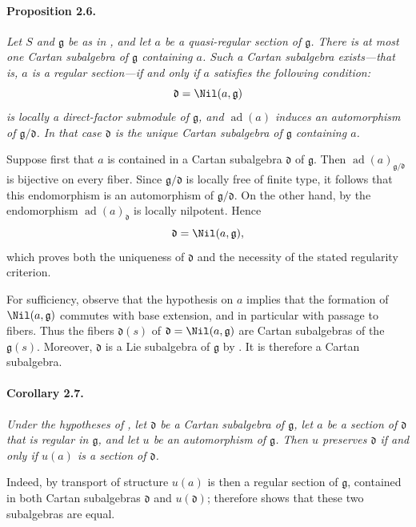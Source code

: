
\paragraph{\textbf{Proposition 2.6.}}
\emph{Let \(S\) and \(\mathfrak g\) be as in , and let \(a\) be a
quasi-regular section of \(\mathfrak g\). There is at most one Cartan
subalgebra of \(\mathfrak g\) containing \(a\). Such a Cartan
subalgebra exists---that is, \(a\) is a regular section---if and only
if \(a\) satisfies the following condition:
\[
  \mathfrak d=\Nil(a,\mathfrak g)
\]
is locally a direct-factor submodule of \(\mathfrak g\), and
\(\operatorname{ad}(a)\) induces an automorphism of
\(\mathfrak g/\mathfrak d\). In that case \(\mathfrak d\) is the
unique Cartan subalgebra of \(\mathfrak g\) containing \(a\).}

Suppose first that \(a\) is contained in a Cartan subalgebra
\(\mathfrak d\) of \(\mathfrak g\). Then
\(\operatorname{ad}(a)_{\mathfrak g/\mathfrak d}\) is bijective on
every fiber. Since \(\mathfrak g/\mathfrak d\) is locally free of
finite type, it follows that this endomorphism is an automorphism of
\(\mathfrak g/\mathfrak d\). On the other hand, by  the
endomorphism \(\operatorname{ad}(a)_{\mathfrak d}\) is locally
nilpotent. Hence
\[
  \mathfrak d=\Nil(a,\mathfrak g),
\]
which proves both the uniqueness of \(\mathfrak d\) and the
necessity of the stated regularity criterion.

For sufficiency, observe that the hypothesis on \(a\) implies that
the formation of \(\Nil(a,\mathfrak g)\) commutes with base
extension, and in particular with passage to fibers. Thus the fibers
\(\mathfrak d(s)\) of
\(\mathfrak d=\Nil(a,\mathfrak g)\) are Cartan subalgebras of the
\(\mathfrak g(s)\). Moreover, \(\mathfrak d\) is a Lie subalgebra of
\(\mathfrak g\) by . It is therefore a Cartan subalgebra.

\paragraph{\textbf{Corollary 2.7.}}
\emph{Under the hypotheses of , let \(\mathfrak d\) be a Cartan
subalgebra of \(\mathfrak g\), let \(a\) be a section of
\(\mathfrak d\) that is regular in \(\mathfrak g\), and let \(u\) be
an automorphism of \(\mathfrak g\). Then \(u\) preserves
\(\mathfrak d\) if and only if \(u(a)\) is a section of
\(\mathfrak d\).}

Indeed, by transport of structure \(u(a)\) is then a regular section
of \(\mathfrak g\), contained in both Cartan subalgebras
\(\mathfrak d\) and \(u(\mathfrak d)\);  therefore
shows that these two subalgebras are equal.
